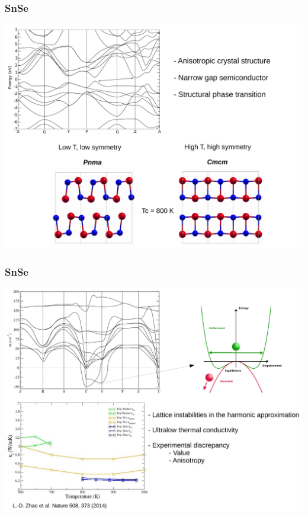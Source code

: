 \documentclass{beamer}
\begin{document}

\begin{frame}

\frametitle{SnSe}
\begin{center}
  \includegraphics[width=0.85\linewidth]{Pictures/SnSe/figure1.pdf}
\end{center}

\end{frame}


\begin{frame}

\frametitle{SnSe}
\begin{center}
  \includegraphics[width=0.85\linewidth]{Pictures/SnSe/figure2.pdf}
\end{center}

\end{frame}
\end{document}
